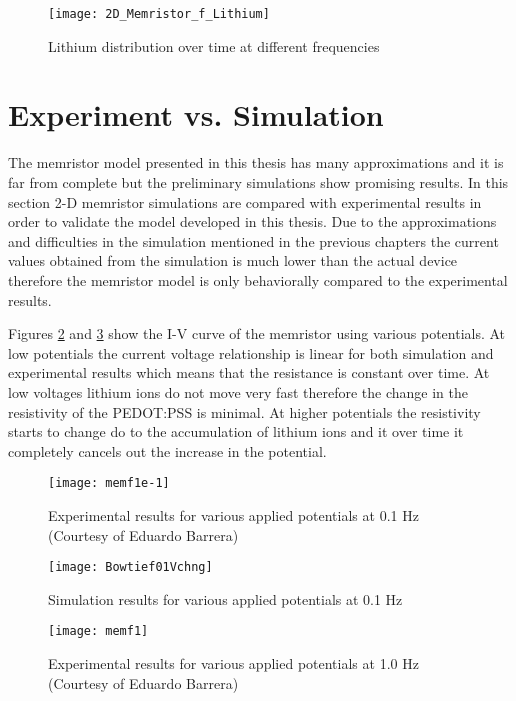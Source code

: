 \begin{doublespace}
\begin{figure}[!htp]
\centering
\texttt{[image: 2D\_Memristor\_f\_Lithium]}
\caption{Lithium distribution over time at different frequencies} 
\label{flit}
\end{figure}


\clearpage
\section{Experiment vs. Simulation}

The memristor model presented in this thesis has many approximations and it is far from complete but the preliminary simulations show promising results. In this section 2-D memristor simulations are compared with experimental results in order to validate the model developed in this thesis. Due to the approximations and difficulties in the simulation mentioned in the previous chapters the current values obtained from the simulation is much lower than the actual device therefore the memristor model is only behaviorally compared to the experimental results. 

Figures \ref{memf1e-1} and \ref{Bowtief01Vchng} show the I-V curve of the memristor using various potentials. At low potentials the current voltage relationship is linear for both simulation and experimental results which means that the resistance is constant over time. At low voltages lithium ions do not move very fast therefore the change in the resistivity of the PEDOT:PSS is minimal. At higher potentials the resistivity starts to change do to the accumulation of lithium ions and it over time it completely cancels out the increase in the potential. 

\clearpage
\begin{figure}[!htp]
\centering
\texttt{[image: memf1e-1]}
\caption{Experimental results for various applied potentials at 0.1 Hz (Courtesy of Eduardo Barrera)} 
\label{memf1e-1}
\end{figure}

\begin{figure}[!htp]
\centering
\texttt{[image: Bowtief01Vchng]}
\caption{Simulation results for various applied potentials at 0.1 Hz} 
\label{Bowtief01Vchng}
\end{figure}

\clearpage


\begin{figure}[!htp]
\centering
\texttt{[image: memf1]}
\caption{Experimental results for various applied potentials at 1.0 Hz (Courtesy of Eduardo Barrera)} 
\label{memf1}
\end{figure}



\end{doublespace}

